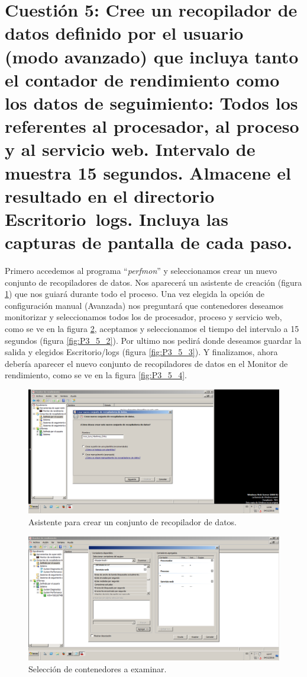 \section{Cuestión 5: Cree un recopilador de datos definido por el usuario (modo avanzado) que incluya tanto el contador de rendimiento como los datos de seguimiento: Todos los referentes al procesador, al proceso y al servicio web. Intervalo de muestra 15 segundos. Almacene el resultado en el directorio Escritorio\ logs. Incluya las capturas de pantalla de cada paso.}
Primero accedemos al programa ``\textit{perfmon}'' y seleccionamos crear un nuevo conjunto de 
recopiladores de datos. Nos aparecerá un asistente de creación (figura \ref{fig:P3_5_0}) que nos guiará
durante todo el proceso. Una vez elegida la opción de configuración manual (Avanzada) nos preguntará
que contenedores deseamos monitorizar y seleccionamos todos los de procesador, proceso y servicio web,
como se ve en la figura \ref{fig:P3_5_1}, aceptamos y seleccionamos el tiempo del intervalo a 15 segundos
(figura \ref{fig:P3_5_2}).
Por ultimo nos pedirá donde deseamos guardar la salida y elegidos Escritorio/logs (figura \ref{fig:P3_5_3}).
Y finalizamos, ahora debería aparecer el nuevo conjunto de recopiladores de datos en el Monitor de 
rendimiento, como se ve en la figura \ref{fig:P3_5_4}.



\begin{figure}[H] %
\centering
\includegraphics[scale=0.4]{./imagenes/P3_5_0.png} 
\caption{Asistente para crear un conjunto de recopilador de datos.} \label{fig:P3_5_0}
\end{figure}

\begin{figure}[H] %
\centering
\includegraphics[scale=0.4]{./imagenes/P3_5_1.png} 
\caption{Selección de contenedores a examinar.} \label{fig:P3_5_1}
\end{figure}

